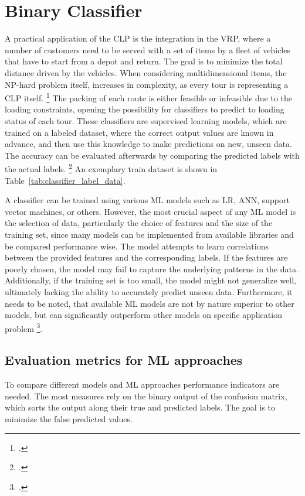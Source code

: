 \chapter{Binary Classifier}
\label{chap:classifier}

A practical application of the \gls{CLP} is the integration in the \gls{VRP}, where
a number of customers need to be served with a set of items by a fleet of vehicles that have
to start from a depot and return. The goal is to minimize the total distance driven
by the vehicles. When considering multidimensional items, the NP-hard problem itself,
increases in complexity, as every tour is representing a \gls{CLP} itself. \footcite[cf.][pp. 1--2]{tamke_branch-and-cut_2024}
The packing of each route is either feasible or infeasible due to the loading constraints,
opening the possibility for classifiers to predict to loading status of each tour.
These classifiers are supervised learning models, which are trained on a labeled dataset,
where the correct output values are known in advance, and then use this knowledge to
make predictions on new, unseen data. The accuracy can be evaluated afterwards by comparing
the predicted labels with the actual labels. \footcite[cf.][]{kotsiantis_supervised_2007}
An exemplary train dataset is shown in Table~\ref{tab:classifier_label_data}.



A classifier can be trained using various \gls{ML} models such as \gls{LR},
\gls{ANN}, support vector machines, or others. However, the most crucial aspect of any
\gls{ML} model is the selection of data, particularly the choice of features and
the size of the training set, since many models can be implemented from available
libraries and be compared performance wise. The model attempts to learn correlations between the provided features
and the corresponding labels. If the features are poorly chosen, the model may fail
to capture the underlying patterns in the data. Additionally, if the training set
is too small, the model might not generalize well, ultimately lacking the ability
to accurately predict unseen data. Furthermore, it needs to be noted, that available
\gls{ML} models are not by nature superior to other models, but can significantly outperform
other models on specific application problem \footcite[cf.][pp. 250, 264]{kotsiantis_supervised_2007}.


\section{Evaluation metrics for ML approaches}
\label{sec:classifier_objectives}
To compare different models and \gls{ML} approaches performance indicators are needed. The most
measures rely on the binary output of the confusion matrix, which sorts the output along
their true and predicted labels. The goal is to minimize the false predicted values.
\begin{comment}
The predicted labels of the \gls{ML} model are
divided in two groups via a certain threshold, usually 0.5, with all predicted values above it,
considered in the predictive positive column and below it, in the predicted negative column.
\end{comment}

